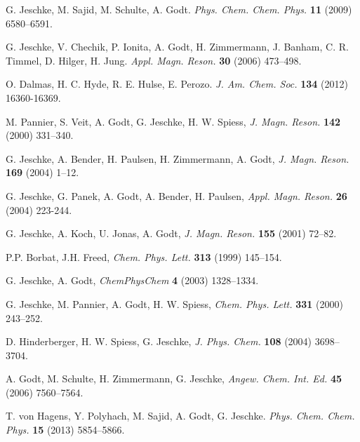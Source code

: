 \documentclass{article}
\begin{document}
\begin{thebibliography}{00}




G. Jeschke, M. Sajid, M. Schulte, A. Godt.
{\em Phys. Chem. Chem. Phys.} {\bf 11} (2009) 6580--6591.

G. Jeschke, V. Chechik, P. Ionita, A. Godt, H. Zimmermann, J. Banham, C. R. Timmel, D. Hilger, H. Jung.
{\em Appl. Magn. Reson.} {\bf 30} (2006) 473--498.

O. Dalmas, H. C. Hyde, R. E. Hulse, E. Perozo. 
{\em J. Am. Chem. Soc.} {\bf 134} (2012) 16360-16369.


M. Pannier, S. Veit, A. Godt, G. Jeschke, H. W. Spiess,
{\em J. Magn. Reson.} {\bf 142} (2000) 331--340.

G. Jeschke, A. Bender, H. Paulsen, H. Zimmermann, A. Godt,
{\em J. Magn. Reson.} {\bf 169} (2004) 1--12.

G. Jeschke, G. Panek, A. Godt, A. Bender, H. Paulsen,
{\em Appl. Magn. Reson.} {\bf 26} (2004) 223-244.

G. Jeschke, A. Koch, U. Jonas, A. Godt,
{\em J. Magn. Reson.} {\bf 155} (2001) 72--82.

P.P. Borbat, J.H. Freed,
{\em Chem. Phys. Lett.} {\bf 313} (1999) 145--154.

G. Jeschke, A. Godt,
{\em ChemPhysChem} {\bf 4} (2003) 1328--1334.

G. Jeschke, M. Pannier, A. Godt, H. W. Spiess,
{\em Chem. Phys. Lett.} {\bf 331} (2000) 243--252.

D. Hinderberger, H. W. Spiess, G. Jeschke,
{\em J. Phys. Chem.} {\bf 108} (2004) 3698--3704.

A. Godt, M. Schulte, H. Zimmermann, G. Jeschke,
{\em Angew. Chem. Int. Ed.} {\bf 45} (2006) 7560--7564.

T. von Hagens, Y. Polyhach, M. Sajid, A. Godt, G. Jeschke.
{\em Phys. Chem. Chem. Phys.} {\bf 15} (2013) 5854--5866.


\end{thebibliography}
\end{document}
